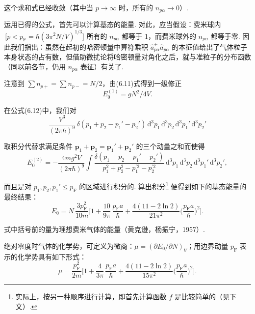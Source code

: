 这个求和式已经收敛（其中当 $p\to\infty$ 时，所有的 $n_{p\alpha}\to0$）.

运用已得的公式，首先可以计算基态的能量. 对此，应当假设：费米球内$\,\bigl[p<p_{\mathrm F}=\hbar(3\pi^{2}N/V)^{1/3}\bigr]$ 所有的 $n_{p\alpha}$ 都等于 1，而费米球外的 $n_{p\alpha}$ 都等于零. 因此我们指出：虽然在起初的哈密顿量中算符乘积 $\hat a^{+}_{p\alpha}\hat a_{p\alpha}$ 的本征值给出了气体粒子本身状态的占有数，但借助微扰论将哈密顿量对角化之后，就与准粒子的分布函数（同以前各节，仍用 $n_{p\alpha}$ 表征）有关了.

注意到 $\sum n_{p+}=\sum n_{p-}=N/2$，由(6.11)式得到一级修正
\begin{equation*}
E_{0}^{(1)}=gN^{2}/4V.
\end{equation*}

在公式(6.12)中，我们对
\begin{equation*}
\frac{V^{3}}{(2\pi\hbar)^{9}}\,\delta(p_{1}+p_{2}-p_{1}'-p_{2}')\,
\mathrm{d}^{3}p_{1}\,\mathrm{d}^{3}p_{2}\,\mathrm{d}^{3}p_{1}'\,\mathrm{d}^{3}p_{2}'
\end{equation*}

取积分代替求满足条件 $\bm p_{1}+\bm p_{2}=\bm p_{1}'+\bm p_{2}'$ 的三个动量之和而使得
\begin{equation*}
E_{0}^{(2)}=-\frac{4mg^{2}V}{(2\pi\hbar)^{9}}\int
\frac{\delta(p_{1}+p_{2}-p_{1}'-p_{2}')}{p_{1}^{2}+p_{2}^{2}-p_{1}^{\prime2}-p_{2}^{\prime2}}\,
\mathrm{d}^{3}p_{1}\,\mathrm{d}^{3}p_{2}\,\mathrm{d}^{3}p_{1}'\,\mathrm{d}^{3}p_{2}',
\end{equation*}

而且是对 $p_{1},p_{2},p_{1}'\leqslant p_{\mathrm F}$ 的区域进行积分的. 算出积分\footnote{实际上，按另一种顺序进行计算，即首先计算函数 $f$ 是比较简单的（见下文）.} 便得到如下的基态能量的最终结果：
\begin{equation}
E_{0}=N\,\frac{3p_{\mathrm F}^{2}}{10m}\biggl[1+\frac{10}{9\pi}\,\frac{p_{\mathrm F}a}{\hbar}
+\frac{4(11-2\ln 2)}{21\pi^{2}}\biggl(\frac{p_{\mathrm F}a}{\hbar}\biggr)^{2}\biggr].
\end{equation}

式中括号前的量为理想费米气体的能量（黄克逊，杨振宁，1957）.

绝对零度时气体的化学势，可定义为微商：$\mu=(\partial E_{0}/\partial N)_{V}$；用边界动量 $p_{\mathrm F}$ 表示的化学势具有如下形式：
\begin{equation}
\mu=\frac{p_{\mathrm F}^{2}}{2m}\biggl[1+\frac{4}{3\pi}\,\frac{p_{\mathrm F}a}{\hbar}
+\frac{4(11-2\ln 2)}{15\pi^{2}}\biggl(\frac{p_{\mathrm F}a}{\hbar}\biggr)^{2}\biggr].
\end{equation}

